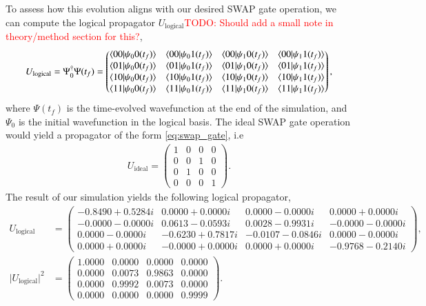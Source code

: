 \documentclass{subfiles}
\begin{document}
To assess how this evolution aligns with our desired SWAP gate operation, we can compute the logical propagator $U_{\text{logical}}$\textcolor{red}{TODO: Should add a small note in theory/method section for this?},
\begin{align*}
    U_{\text{logical}} = \Psi_0^\dagger\Psi(t_f) = \begin{pmatrix}
        \braket{00|\psi_00(t_f)} & \braket{00|\psi_01(t_f)} & \braket{00|\psi_10(t_f)} & \braket{00|\psi_11(t_f)} \\
        \braket{01|\psi_00(t_f)} & \braket{01|\psi_01(t_f)} & \braket{01|\psi_10(t_f)} & \braket{01|\psi_11(t_f)} \\
        \braket{10|\psi_00(t_f)} & \braket{10|\psi_01(t_f)} & \braket{10|\psi_10(t_f)} & \braket{10|\psi_11(t_f)} \\
        \braket{11|\psi_00(t_f)} & \braket{11|\psi_01(t_f)} & \braket{11|\psi_10(t_f)} & \braket{11|\psi_11(t_f)}
    \end{pmatrix},
\end{align*}
where $\Psi(t_f)$ is the time-evolved wavefunction at the end of the simulation, and $\Psi_0$ is the initial wavefunction in the logical basis. The ideal SWAP gate operation would yield a propagator of the form \eqref{eq:swap_gate}, i.e
\begin{align*}
    U_{\text{ideal}} = \begin{pmatrix}
        1 & 0 & 0 & 0 \\
        0 & 0 & 1 & 0 \\
        0 & 1 & 0 & 0 \\
        0 & 0 & 0 & 1
    \end{pmatrix}.
\end{align*}
The result of our simulation yields the following logical propagator,
\begin{align*}
U_{\text{logical}}
&=
\begin{pmatrix}
-0.8490 + 0.5284i &  0.0000 + 0.0000i &  0.0000 - 0.0000i &  0.0000 + 0.0000i \\
-0.0000 - 0.0000i &  0.0613 - 0.0593i &  0.0028 - 0.9931i & -0.0000 - 0.0000i \\
 0.0000 - 0.0000i & -0.6230 + 0.7817i & -0.0107 - 0.0846i &  0.0000 - 0.0000i \\
 0.0000 + 0.0000i & -0.0000 + 0.0000i &  0.0000 + 0.0000i & -0.9768 - 0.2140i
\end{pmatrix},\\[1ex]
\lvert U_{\text{logical}}\rvert^2
&=
\begin{pmatrix}
1.0000 & 0.0000 & 0.0000 & 0.0000 \\
0.0000 & 0.0073 & 0.9863 & 0.0000 \\
0.0000 & 0.9992 & 0.0073 & 0.0000 \\
0.0000 & 0.0000 & 0.0000 & 0.9999
\end{pmatrix}.
\end{align*}
\end{document}
